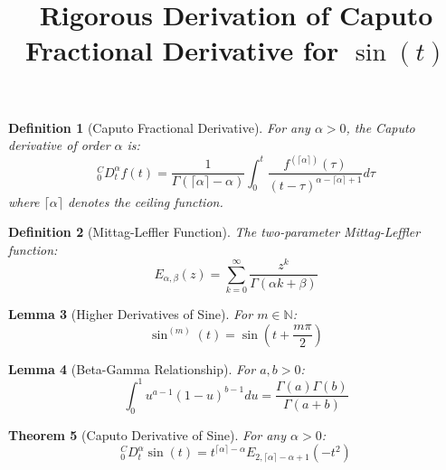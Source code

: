 \documentclass{article}
\title{Rigorous Derivation of Caputo Fractional Derivative for $\sin(t)$}
\author{}
\date{}
\newtheorem{theorem}{Theorem}
\newtheorem{definition}[theorem]{Definition}
\newtheorem{lemma}[theorem]{Lemma}
\begin{document}
\maketitle

\begin{definition}[Caputo Fractional Derivative]
For any $\alpha > 0$, the Caputo derivative of order $\alpha$ is:
\begin{equation}
_0^CD_t^\alpha f(t) = \frac{1}{\Gamma(\lceil \alpha \rceil - \alpha)} \int_0^t \frac{f^{(\lceil \alpha \rceil)}(\tau)}{(t-\tau)^{\alpha - \lceil \alpha \rceil + 1}} d\tau
\end{equation}
where $\lceil\alpha\rceil$ denotes the ceiling function.
\end{definition}

\begin{definition}[Mittag-Leffler Function]
The two-parameter Mittag-Leffler function:
\begin{equation}
E_{\alpha,\beta}(z) = \sum_{k=0}^\infty \frac{z^k}{\Gamma(\alpha k + \beta)}
\end{equation}
\end{definition}

\begin{lemma}[Higher Derivatives of Sine]
For $m \in \mathbb{N}$:
\begin{equation}
\sin^{(m)}(t) = \sin\left(t + \frac{m\pi}{2}\right)
\end{equation}
\end{lemma}

\begin{lemma}[Beta-Gamma Relationship]
For $a,b > 0$:
\begin{equation}
\int_0^1 u^{a-1}(1-u)^{b-1} du = \frac{\Gamma(a)\Gamma(b)}{\Gamma(a+b)}
\end{equation}
\end{lemma}

\begin{theorem}[Caputo Derivative of Sine]
For any $\alpha > 0$:
\begin{equation}
_0^CD_t^\alpha \sin(t) = t^{\lceil\alpha\rceil-\alpha} E_{2,\lceil\alpha\rceil-\alpha+1}(-t^2)
\end{equation}
\end{theorem}
\end{document}

